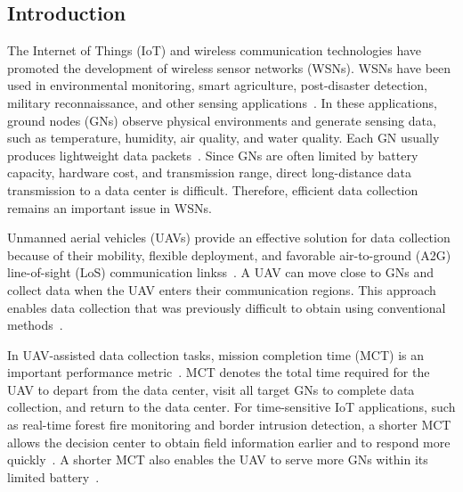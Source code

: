 \documentclass[12pt]{ksthesis}
\begin{document}
\begin{thesis}\large{

\chapter{Introduction}

    The Internet of Things (IoT) and wireless communication technologies have promoted the development of wireless sensor networks (WSNs). WSNs have been used in environmental monitoring, smart agriculture, post-disaster detection, military reconnaissance, and other sensing applications~\cite{Qin2019, Zhang2023, Xiang2023UAVMEC}. In these applications, ground nodes (GNs) observe physical environments and generate sensing data, such as temperature, humidity, air quality, and water quality. Each GN usually produces lightweight data packets~\cite{Meng2025UAVPathPlanningSurvey, Wei2022UAVIoTSurvey}. Since GNs are often limited by battery capacity, hardware cost, and transmission range, direct long-distance data transmission to a data center is difficult. Therefore, efficient data collection remains an important issue in WSNs.

    Unmanned aerial vehicles (UAVs) provide an effective solution for data collection because of their mobility, flexible deployment, and favorable air-to-ground (A2G) line-of-sight (LoS) communication linkss~\cite{Zeng2019UAVTutorial, AlHourani2014LAPAltitude}. A UAV can move close to GNs and collect data when the UAV enters their communication regions. This approach enables data collection that was previously difficult to obtain using conventional methods~\cite{Zeng2019EnergyMinimization, Wu2018MultiUAVTrajectoryCommunication}.

    In UAV-assisted data collection tasks, mission completion time (MCT) is an important performance metric~\cite{Zhang2023CompletionTimeDRL}. MCT denotes the total time required for the UAV to depart from the data center, visit all target GNs to complete data collection, and return to the data center. For time-sensitive IoT applications, such as real-time forest fire monitoring and border intrusion detection, a shorter MCT allows the decision center to obtain field information earlier and to respond more quickly~\cite{Shen2022MultiUAVTimeWindows, Li2022MCT}. A shorter MCT also enables the UAV to serve more GNs within its limited battery~\cite{Li2023DataCollectionMaximization}.

}
\end{thesis}
\end{document}
